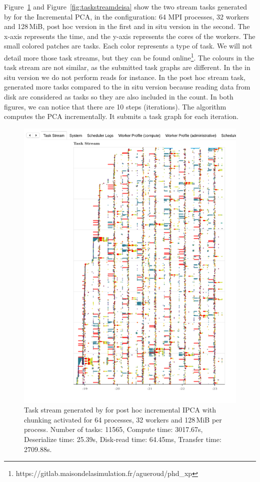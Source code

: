 Figure~\ref{fig:taskstreamdask} and Figure~\ref{fig:taskstreamdeisa} show the two stream tasks generated by \dask for the Incremental PCA, in the configuration: 64 MPI processes, 32 workers and 128\,MiB, \dask post hoc version in the first and \deisa in situ version in the second. The x-axis represents the time, and the y-axis represents the cores of the workers. 
The small colored patches are tasks. Each color represents a type of task. We will not detail more those task streams, but they can be found online\footnote{https://gitlab.maisondelasimulation.fr/agueroud/phd\_xp}. 
The colours in the task stream are not similar, as the submitted task graphs are different. In the in situ version we do not perform reads for instance.
In the post hoc stream task, \dask generated more tasks compared to the in situ version because reading data from disk are considered as tasks so they are also included in the count. 
In both figures, we can notice that there are 10 steps (iterations). The algorithm computes the PCA incrementally. It submits a task graph for each iteration.


\begin{figure}[ht]\centering
\includegraphics[width=\columnwidth]{figures/P64_W32_D128_DASK_CHUNK.pdf}
\caption{Task stream generated by \dask for post hoc incremental IPCA with chunking activated for 64 processes, 32 workers and 128\,MiB per process. 
    Number of tasks: 11565,
    Compute time: 3017.67s, 
    Deserialize time: 25.39s,
    Disk-read time: 64.45ms,
    Transfer time: 2709.88s.}
\label{fig:taskstreamdask}
\end{figure}


